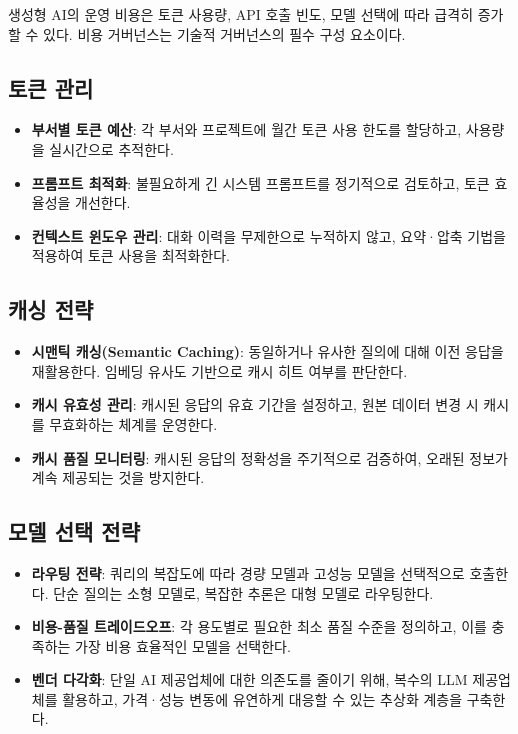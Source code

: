 생성형 AI의 운영 비용은 토큰 사용량, API 호출 빈도, 모델 선택에 따라 급격히 증가할 수 있다. 비용 거버넌스는 기술적 거버넌스의 필수 구성 요소이다.

\subsection{토큰 관리}

\begin{itemize}
 \item \textbf{부서별 토큰 예산}: 각 부서와 프로젝트에 월간 토큰 사용 한도를 할당하고, 사용량을 실시간으로 추적한다.
 \item \textbf{프롬프트 최적화}: 불필요하게 긴 시스템 프롬프트를 정기적으로 검토하고, 토큰 효율성을 개선한다.
 \item \textbf{컨텍스트 윈도우 관리}: 대화 이력을 무제한으로 누적하지 않고, 요약·압축 기법을 적용하여 토큰 사용을 최적화한다.
\end{itemize}

\subsection{캐싱 전략}

\begin{itemize}
 \item \textbf{시맨틱 캐싱(Semantic Caching)}: 동일하거나 유사한 질의에 대해 이전 응답을 재활용한다. 임베딩 유사도 기반으로 캐시 히트 여부를 판단한다.
 \item \textbf{캐시 유효성 관리}: 캐시된 응답의 유효 기간을 설정하고, 원본 데이터 변경 시 캐시를 무효화하는 체계를 운영한다.
 \item \textbf{캐시 품질 모니터링}: 캐시된 응답의 정확성을 주기적으로 검증하여, 오래된 정보가 계속 제공되는 것을 방지한다.
\end{itemize}

\subsection{모델 선택 전략}

\begin{itemize}
 \item \textbf{라우팅 전략}: 쿼리의 복잡도에 따라 경량 모델과 고성능 모델을 선택적으로 호출한다. 단순 질의는 소형 모델로, 복잡한 추론은 대형 모델로 라우팅한다.
 \item \textbf{비용-품질 트레이드오프}: 각 용도별로 필요한 최소 품질 수준을 정의하고, 이를 충족하는 가장 비용 효율적인 모델을 선택한다.
 \item \textbf{벤더 다각화}: 단일 AI 제공업체에 대한 의존도를 줄이기 위해, 복수의 LLM 제공업체를 활용하고, 가격·성능 변동에 유연하게 대응할 수 있는 추상화 계층을 구축한다.
\end{itemize}

